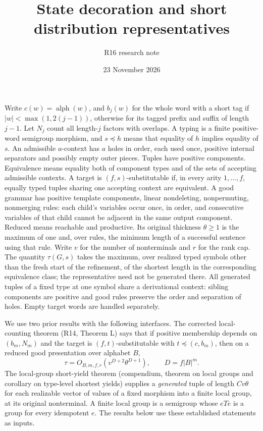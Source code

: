 \documentclass[11pt]{article}
\newcommand{\rdcnt}{\operatorname{alph}}
\begin{document}
\title{State decoration and short distribution representatives}
\author{R16 research note}\date{23 November 2026}\maketitle
\fi

Write $c(w)=\rdcnt(w)$, and $b_j(w)$ for the whole word with a short tag if
$|w|<\max(1,2(j-1))$, otherwise for its tagged prefix and suffix of length
$j-1$. Let $N_j$ count all length-$j$ factors with overlaps. A typing is a
finite positive-word semigroup morphism, and $s\preceq h$ means that equality
of $h$ implies equality of $s$. An admissible $a$-context has $a$ holes in
order, each used once, positive internal separators and possibly empty outer
pieces. Tuples have positive components. Equivalence means equality both
of component types and of the sets of accepting admissible contexts. A target
is $(f,s)$-substitutable if, in every arity $1,\ldots,f$, equally typed tuples
sharing one accepting context are equivalent. A good grammar has positive
template components, linear nondeleting, nonpermuting, nonmerging rules:
each child's variables occur once, in order, and consecutive variables of
that child cannot be adjacent in the same output component. Reduced means
reachable and productive. Its original thickness $\theta\ge1$ is the maximum
of one and, over rules, the minimum length of a successful sentence using
that rule. Write $v$ for the number of nonterminals and $r$ for the rank cap.
The quantity $\tau(G,s)$ takes the maximum, over realized typed symbols
other than the fresh start of the refinement,
of the shortest length in the corresponding equivalence class; the representative
need not be generated there. All generated tuples of a fixed type at one
symbol share a derivational context: sibling components are positive and
good rules preserve the order and separation of holes. Empty target words
are handled separately.

We use two prior results with the following interfaces.
The corrected local-counting theorem (R14, Theorem L) says that if positive
membership depends on $(b_m,N_m)$ and the target is $(f,t)$-substitutable
with $t\preceq(c,b_m)$, then on a reduced good presentation over alphabet $B$,
\[
 \tau=O_{B,m,f,r}(v^{D+2}\theta^{D+1}),\qquad D=f|B|^m .
\]
The local-group short-yield theorem (compendium, theorem on local groups and corollary on type-level shortest yields) supplies a \emph{generated} tuple of length
$C v\theta$ for each realizable vector of values of a fixed morphism into
a finite local group, at its original nonterminal. A finite local group is
a semigroup whose $eTe$ is a group for every idempotent $e$.
The results below use these established statements as inputs.
\end{document}

